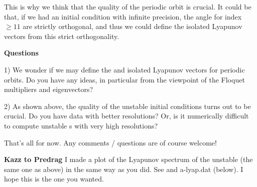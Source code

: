 \begin{description}
  This is why we think that the quality of the periodic orbit is crucial.
  It could be that, if we had an initial condition with infinite
  precision, the angle for index $\geq 11$ are strictly orthogonal, and thus we
  could define the isolated Lyapunov vectors from this strict orthogonality.


  \textbf{Questions}

  1) We wonder if we may define the {\entangled} and isolated Lyapunov vectors for
  periodic orbits. Do you have any ideas, in particular from the viewpoint
  of the Floquet multipliers and eigenvectors?

  2) As shown above, the quality of the {unstable \po} initial conditions turns out
  to be crucial. Do you have data with better resolutions? Or, is it
  numerically difficult to compute {unstable \po}s with very high resolutions?

  That's all for now. Any comments / questions are of course welcome!


  \textbf{Kazz to Predrag} I made a plot of the Lyapunov spectrum of
  the {unstable \po} (the same one as above) in the same way as you did. See 
  and {\po}a-lyap.dat (below). I hope this is the one you wanted.


\end{description}
